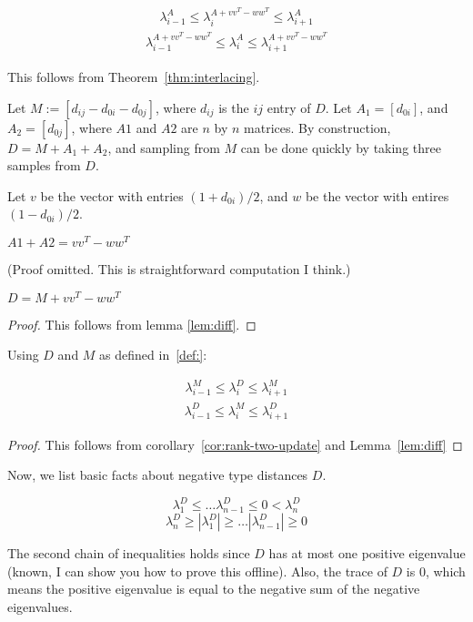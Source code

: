\begin{corollary}
\label{cor:rank-two-update}
\begin{align}
\lambda^A_{i-1} \leq \lambda^{A+vv^T-ww^T}_i \leq \lambda^{A}_{i+1}
\end{align}
\begin{align}
\lambda^{A+vv^T-ww^T}_{i-1} \leq \lambda^{A}_{i} \leq
\lambda^{A+vv^T-ww^T}_{i+1}
\end{align}
\end{corollary}
This follows from Theorem~\ref{thm:interlacing}.

\begin{definition}
  \label{def:}Let $M:=[d_{ij}-d_{0i}-d_{0j}]$, where $d_{ij}$ is the $ij$ entry of
$D$. Let $A_1 = [d_{0i}]$, and $A_2 = [d_{0j}]$, where $A1$ and $A2$ are
$n$ by $n$ matrices. By construction, $D = M + A_1 + A_2$, and sampling
from $M$ can be done quickly by taking three samples from $D$.

Let $v$ be the vector with entries $(1+d_{0i})/2$, and $w$ be the vector
  with entires $(1-d_{0i})/2$.
\end{definition}

\begin{lemma}
\label{lem:diff}
$A1 + A2 = vv^T - ww^T$
\end{lemma}
(Proof omitted. This is straightforward computation I think.)
\begin{lemma}
$ D = M + vv^T - ww^T $
\end{lemma}
\begin{proof}
This follows from lemma \ref{lem:diff}.
\end{proof}
\begin{corollary}
\label{cor:m-and-d}
Using $D$ and $M$ as defined in~\ref{def:}:

\begin{align}
\lambda^M_{i-1} \leq \lambda^{D}_i \leq \lambda^{M}_{i+1}
\end{align}
\begin{align}
\lambda^{D}_{i-1} \leq \lambda^{M}_{i} \leq
\lambda^{D}_{i+1}
\end{align}
      
\end{corollary}
\begin{proof}
This follows from corollary~\ref{cor:rank-two-update} and
Lemma~\ref{lem:diff}
\end{proof}

Now, we list basic facts about negative type distances $D$. 
\begin{theorem}

\[\lambda^D_1 \leq \ldots \lambda^D_{n-1} \leq 0 < \lambda_n^D\]
\[\lambda_n^D \geq |\lambda^D_1| \geq \ldots |\lambda^D_{n-1}| \geq 0 \]

\end{theorem}
The second chain of inequalities holds since $D$ has at most one
positive eigenvalue (known, I can show you how to prove this offline).
Also, the trace of $D$ is $0$, which means the positive eigenvalue is
equal to the negative sum of the negative eigenvalues.

